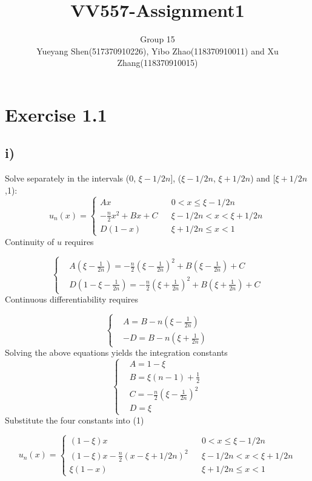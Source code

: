 \documentclass{article}
\title{VV557-Assignment1}
\author{Group 15 \\ Yueyang Shen(517370910226), Yibo Zhao(118370910011) and Xu Zhang(118370910015)}
\date{}
\begin{document}
\maketitle
\section*{Exercise 1.1}
\subsection*{i)}
Solve separately in the intervals (0, $\xi-1/2n$], ($\xi-1/2n$, $\xi+1/2n$) and [$\xi+1/2n$,1):
\begin{equation}
u_n(x)=\left\{
	\begin{array}{lcl}
		Ax		&		& {0 < x \leq \xi-1/2n}\\
		-\frac{n}{2}x^2+Bx+C	&		& {\xi-1/2n < x < \xi+1/2n }\\
		D(1-x)	&		& {\xi+1/2n \leq x < 1}
	\end{array}
\right.
\end{equation}
Continuity of $u$ requires

$$
\left\{
\begin{aligned}
	& A(\xi-\frac{1}{2n})=-\frac{n}{2}(\xi-\frac{1}{2n})^2 + B(\xi-\frac{1}{2n}) + C \\
	& D(1-\xi - \frac{1}{2n})=-\frac{n}{2}(\xi+ \frac{1}{2n})^2 + B(\xi+\frac{1}{2n}) + C
\end{aligned}
\right.
$$
Continuous differentiability requires

$$
\left\{
\begin{aligned}
	& A = B - n(\xi - \frac{1}{2n}) \\
	& -D= B - n(\xi +\frac{1}{2n})
\end{aligned}
\right.
$$
Solving the above equations yields the integration constants
$$
\left\{
\begin{aligned}
	& A = 1- \xi \\
	& B = \xi (n-1) + \frac{1}{2} \\
	& C = -\frac{n}{2}(\xi-\frac{1}{2n})^2 \\
	& D = \xi
\end{aligned}
\right.
$$
Substitute the four constants into (1)

\begin{equation}
u_n(x)=\left\{
	\begin{array}{lcl}
		(1-\xi)x		&		& {0 < x \leq \xi-1/2n}\\
		(1-\xi)x -\frac{n}{2} (x-\xi + 1/2n)^2	&		& {\xi-1/2n < x < \xi+1/2n }\\
		\xi (1-x)	&		& {\xi+1/2n \leq x < 1}
	\end{array}
\right.
\end{equation}
\end{document}
